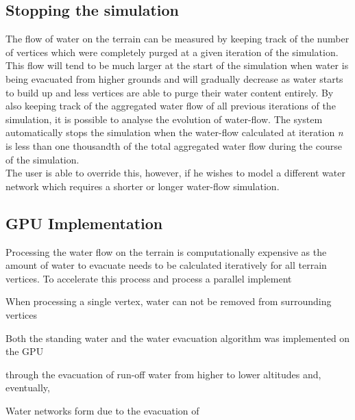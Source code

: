 \subsection{Stopping the simulation}

The flow of water on the terrain can be measured by keeping track of the number of vertices which were completely purged at a given iteration of the simulation. This flow will tend to be much larger at the start of the simulation when water is being evacuated from higher grounds and will gradually decrease as water starts to build up and less vertices are able to purge their water content entirely. By also keeping track of the aggregated water flow of all previous iterations of the simulation, it is possible to analyse the evolution of water-flow. The system automatically stops the simulation when the water-flow calculated at iteration \textit{n} is less than one thousandth of the total aggregated water flow during the course of the simulation. \\

The user is able to override this, however, if he wishes to model a different water network which requires a shorter or longer water-flow simulation. 

\subsection{GPU Implementation}

Processing the water flow on the terrain is computationally expensive as the amount of water to evacuate needs to be calculated iteratively for all terrain vertices. To accelerate this process and  process a parallel implement

When processing a single vertex, water can not be removed from surrounding vertices

Both the standing water and the water evacuation algorithm was implemented on the GPU

through the evacuation of run-off water from higher to lower altitudes and, eventually, 

Water networks form due to the evacuation of 

